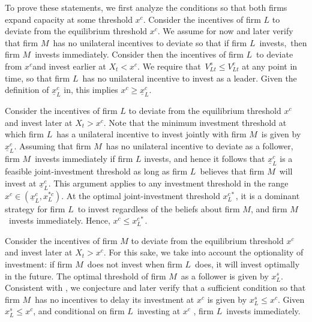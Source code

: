 \documentclass[nogrid,nosurname,sort&compress]{RFS}
\begin{document}
To prove these statements, we first analyze the conditions so that both firms expand capacity at
some threshold $x^{c}$. Consider the incentives of firm $L$ to deviate from the equilibrium
threshold $x^{c}$. We assume for now and later verify that firm $M$\ has no unilateral incentives
to deviate so that if firm $L$\ invests,\ then firm $M$\ invests immediately. Consider then the
incentives of firm $L$\ to deviate from $x^{c}$and invest earlier at $X_{t}<x^{c}$. We require
that\ $V_{Lt}^{s}\leq V_{Lt}^{c}$ at any point in time, so that firm $L$\ has no unilateral
incentive to invest as a leader. Given the definition of $\underline{x}_{L}^{c}$ in, this implies
$x^{c}\geq \underline{x}_{L}^{c}$.

Consider the incentives of firm $L$ to deviate from the equilibrium threshold $x^{c}$ and invest
later at $X_{t}>x^{c}$. Note that the minimum investment threshold at which firm $L$\ has a
unilateral incentive to invest jointly with firm $M$\ is given by $\underline{x}_{L}^{c}$. Assuming that firm $M$\ has no unilateral incentive to deviate as a follower, firm $M$\
invests immediately if firm $L$ invests, and hence it follows that $%
\underline{x}_{L}^{c}$ is a feasible joint-investment threshold as long as firm $L$\ believes that
firm $M$\ will invest at $\underline{x}_{L}^{c}$. This argument applies to any investment threshold in the range $x^{c}\in (%
\underline{x}_{L}^{c},x_{L}^{\ast c}).$ At the optimal joint-investment threshold $x_{L}^{c\ast
}$, it is a dominant strategy for firm $L$\ to invest regardless of the beliefs about firm $M$,
and firm $M$\ invests immediately. Hence, $x^{c}\leq x_{L}^{c\ast }$.

Consider the incentives of firm $M$ to deviate from the equilibrium threshold $x^{c}$ and invest
later at $X_{t}>x^{c}$. For this sake, we take into account the optionality of investment: if
firm $M$\ does not invest when firm $L$\ does, it will invest optimally in the future. The
optimal threshold of firm $M$\ as a follower is given by $x_{L}^{s}$. Consistent with
\cite{pawlina2006}, we conjecture and later verify that a sufficient condition so that firm $M$\
has no incentives to delay its
investment at $x^{c}$ is given by $x_{L}^{s}\leq x^{c}$. Given $%
x_{L}^{s}\leq x^{c}$, and conditional on firm $L$\ investing at $x^{c}$%
, firm $L$\ invests immediately.
\end{document}
